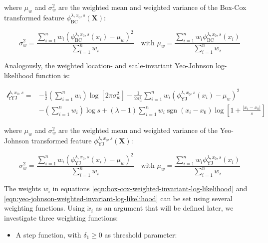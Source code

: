 \documentclass[
  a4paper,
]{article}
\providecommand{\tightlist}{%
  \setlength{\itemsep}{0pt}\setlength{\parskip}{0pt}}
\DeclareMathOperator{\sgn}{sgn}
\begin{document}
where \(\mu_w\) and \(\sigma^2_w\) are the weighted mean and weighted
variance of the Box-Cox transformed feature
\(\phi_{\text{BC}}^{\lambda, x_0, s} (\mathbf{X})\):

\begin{equation}
\sigma_w^2 = \frac{\sum_{i=1}^n w_i \left(\phi_{\text{BC}}^{\lambda, x_0, s} (x_i) - \mu_w \right)^2}{\sum_{i=1}^n w_i} \quad \text{with } \mu_w = \frac{\sum_{i=1}^n w_i \phi_{\text{BC}}^{\lambda, x_0, s} (x_i)} {\sum_{i=1}^n w_i}
\end{equation}

Analogously, the weighted location- and scale-invariant Yeo-Johnson
log-likelihood function is:

\begin{equation}
\label{eqn:yeo-johnson-weighted-invariant-log-likelihood}
\begin{split}
\mathcal{l}_{\text{rYJ}}^{\lambda, x_0, s} = & -\frac{1}{2} \left(\sum_{i=1}^n w_i \right) \log \left[ 2 \pi \sigma_w^2 \right] -\frac{1}{2 \sigma_w^2} \sum_{i=1}^n w_i \left( \phi_{\text{YJ}}^{\lambda, x_0, s}(x_i) - \mu_w \right)^2 \\
& - \left( \sum_{i=1}^n w_i \right) \log s + (\lambda - 1) \sum_{i=1}^n w_i \sgn(x_i - x_0) \log \left[1 + \frac{|x_i - x_0|}{s} \right]
\end{split}
\end{equation}

where \(\mu_w\) and \(\sigma^2_w\) are the weighted mean and weighted
variance of the Yeo-Johnson transformed feature
\(\phi_{\text{YJ}}^{\lambda, x_0, s} (\mathbf{X})\):

\begin{equation}
\sigma_w^2 = \frac{\sum_{i=1}^n w_i \left(\phi_{\text{YJ}}^{\lambda, x_0, s} (x_i) - \mu_w \right)^2}{\sum_{i=1}^n w_i} \quad \text{with } \mu_w = \frac{\sum_{i=1}^n w_i \phi_{\text{YJ}}^{\lambda, x_0, s} (x_i)} {\sum_{i=1}^n w_i}
\end{equation}

The weights \(w_i\) in equations
\ref{eqn:box-cox-weighted-invariant-log-likelihood} and
\ref{eqn:yeo-johnson-weighted-invariant-log-likelihood} can be set using
several weighting functions. Using \(\dot{x}_i\) as an argument that
will be defined later, we investigate three weighting functions:

\begin{itemize}
\tightlist
\item
  A step function, with \(\delta_1 \geq 0\) as threshold parameter:
\end{itemize}
\end{document}
